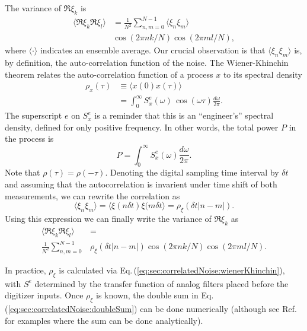 The variance of $\Re \xi_k$ is
\begin{align}
\langle \Re \xi_k \Re \xi_l \rangle &= \frac{1}{N^2} \sum_{n,m=0}^{N-1} \langle \xi_n \xi_m \rangle \nonumber \\
& \cos\left(2 \pi n k / N \right) \cos \left( 2 \pi m l / N \right) ,
\end{align}
where $\langle \cdot \rangle$ indicates an ensemble average.
Our crucial observation is that $\langle \xi_n \xi_m \rangle$ is, by definition, the auto-correlation function of the noise.
The Wiener-Khinchin theorem relates the auto-correlation function of a process $x$ to its spectral density \begin{align}
\rho_x(\tau) & \equiv \langle x(0) x(\tau) \rangle \\
& = \int_0^{\infty} S^e_x(\omega)\,\cos\left( \omega \tau \right) \frac{d\omega}{2\pi} . \label{eq:sec:correlatedNoise:wienerKhinchin} \end{align}
The superscript $e$ on $S^e_x$ is a reminder that this is an ``engineer's'' spectral density, defined for only positive frequency.
In other words, the total power $P$ in the process is \begin{equation}
P = \int_{0}^{\infty} S^e_x(\omega) \frac{d\omega}{2\pi} . \end{equation}
Note that $\rho(\tau) = \rho(-\tau)$.
Denoting the digital sampling time interval by $\delta t$ and assuming that the autocorrelation is invarient under time shift of both measurements, we can rewrite the correlation as \begin{equation}
\langle \xi_n \xi_m \rangle = \langle \xi(n\delta t) \xi(m\delta t \rangle = \rho_{\xi}(\delta t \left| n - m \right|) . \end{equation}
Using this expression we can finally write the variance of $\Re \xi_k$ as \begin{align}
\langle \Re \xi_k \Re \xi_l \rangle &= \nonumber \\
\frac{1}{N^2} \sum_{n,m=0}^{N-1} & \rho_{\xi}(\delta t \left| n - m \right|) \cos \left( 2\pi n k / N \right) \cos \left( 2\pi m l / N \right) . \label{eq:sec:correlatedNoise:doubleSum} \end{align}

In practice, $\rho_{\xi}$ is calculated via Eq.\,(\ref{eq:sec:correlatedNoise:wienerKhinchin}), with $S^e$ determined by the transfer function of analog filters placed before the digitizer inputs.
Once $\rho_{\xi}$ is known, the double sum in Eq.\,(\ref{eq:sec:correlatedNoise:doubleSum}) can be done numerically (although see Ref.\,\cite{Schoukens:DFTNoise1986} for examples where the sum can be done analytically).
